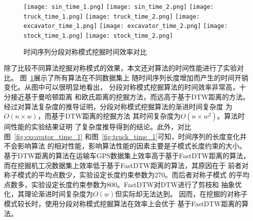 \begin{figure}
  \centering
  {\texttt{[image: sin\_time\_1.png]}}
  {\texttt{[image: sin\_time\_2.png]}}
  {\texttt{[image: truck\_time\_1.png]}}
  {\texttt{[image: truck\_time\_2.png]}}
  {\texttt{[image: excavator\_time\_1.png]}}
  {\texttt{[image: excavator\_time\_2.png]}}
  {\texttt{[image: stock\_time\_1.png]}}
  {\texttt{[image: stock\_time\_2.png]}}
  \caption{时间序列分段对称模式挖掘时间效率对比}
  \label{fig:segement_algorithm_time}
\end{figure}

除了比较不同算法挖掘对称模式的效果，本文还对算法的时间性能进行了实验对比。
图~\ref{fig:segement_algorithm_time}展示了所有算法在不同数据集上
随时间序列长度增加而产生的时间开销变化。从图中可以很明显地看出，
分段对称模式挖掘算法的时间效率非常高，十分接近基于曼哈顿距离
和欧氏距离的挖掘方法，而远高于基于DTW距离的方法。
经过对算法复杂度的推导证明，分段对称模式挖掘算法的渐进时间复杂度
为$O\left(n \times w\right)$，而基于DTW距离的挖掘方法
其时间复杂度为$O\left(n \times w^2\right)$。算法时间性能的实验结果证明
了复杂度推导得到的结论。此外，对比图~\ref{fig:excavator_time_1}
和图~\ref{fig:truck_time_1}可知，时间序列的长度变化并不会影响算法
的相对性能，影响算法性能的因素主要是子模式长度约束的大小。
基于DTW距离的算法在运输车GPS数据集上效率高于基于FastDTW距离的算法，
而在挖掘机工况数据集上效率低于基于FastDTW距离的算法，其原因在于
前者对称子模式的平均点数少，实验设定长度约束参数为270。而后者对称子模式
的平均点数多，实验设定长度约束参数为800。FastDTW对DTW进行了剪枝和
抽象优化\cite{DBLP:journals/ida/SalvadorC07}，其理论渐进时间复杂度为$O\left(w\right)$但实际却无法达到。
因而，在挖掘的对称子模式较长时，使用分段对称模式挖掘算法在效率上会优于
基于FastDTW距离的算法。

